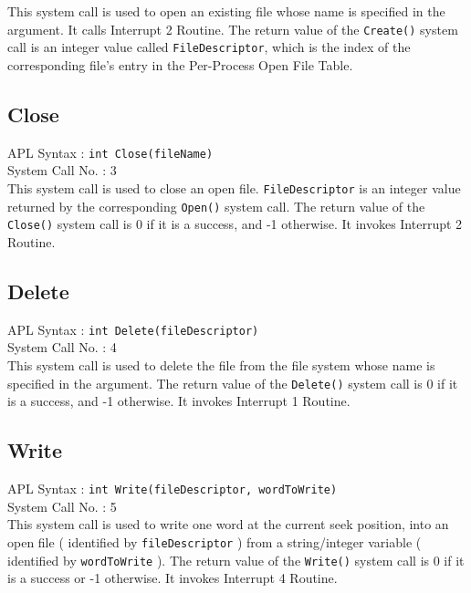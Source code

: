 \documentclass[10pt]{report}
\begin{document}
This system call is used to open an existing file whose name is specified in the argument.  It calls Interrupt 2 Routine. The return value of the \texttt{Create()} system call is an integer value called \texttt{FileDescriptor}, which is the index of the corresponding file's entry in the Per-Process Open File Table.\\


\subsection{Close}
\label{sec:close()}

APL Syntax : \texttt{int Close(fileName)} \\
System Call No. : 3 \\

This system call is used to close an open file.  \texttt{FileDescriptor} is an integer value returned by the corresponding \texttt{Open()} system call. The return value of the \texttt{Close()} system call is 0 if it is a success, and -1 otherwise. It invokes Interrupt 2 Routine. \\


\subsection{Delete}
\label{sec:delete()}

APL Syntax : \texttt{int Delete(fileDescriptor)} \\
System Call No. : 4\\

This system call is used to delete the file from the file system whose name is specified in the argument. The return value of the \texttt{Delete()} system call is 0 if it is a success, and -1 otherwise. It invokes Interrupt 1 Routine. \\


\subsection{Write}
\label{sec:write()}

APL Syntax : \texttt{int Write(fileDescriptor, wordToWrite)}  \\
System Call No. : 5 \\

This system call is used to write one word at the current seek position, into an open file ( identified by \texttt{fileDescriptor} ) from a string/integer variable ( identified by \texttt{wordToWrite} ). The return value of the \texttt{Write()} system call is 0 if it is a success or -1 otherwise. It invokes Interrupt 4 Routine.\\
\end{document}

